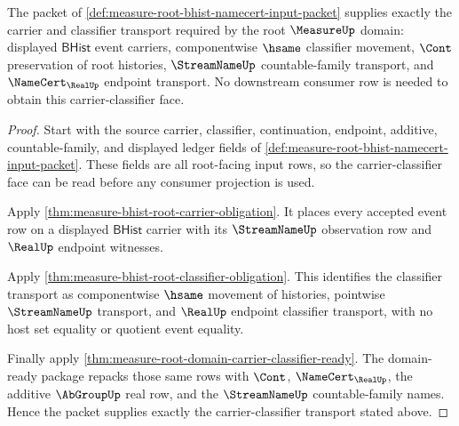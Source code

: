 \begin{theorem}
\label{thm:measure-root-bhist-input-carrier-classifier}
The packet of
\autoref{def:measure-root-bhist-namecert-input-packet} supplies exactly the
carrier and classifier transport required by the root $\MeasureUp$ domain:
displayed $\mathsf{BHist}$ event carriers, componentwise $\hsame$ classifier
movement, $\Cont$ preservation of root histories, $\StreamNameUp$
countable-family transport, and $\NameCert_{\RealUp}$ endpoint transport.
No downstream consumer row is needed to obtain this carrier-classifier face.
\end{theorem}
\begin{proof}
Start with the source carrier, classifier, continuation, endpoint, additive,
countable-family, and displayed ledger fields of
\autoref{def:measure-root-bhist-namecert-input-packet}. These fields are all
root-facing input rows, so the carrier-classifier face can be read before any
consumer projection is used.

Apply \autoref{thm:measure-bhist-root-carrier-obligation}. It places every
accepted event row on a displayed $\mathsf{BHist}$ carrier with its
$\StreamNameUp$ observation row and $\RealUp$ endpoint witnesses.

Apply \autoref{thm:measure-bhist-root-classifier-obligation}. This identifies
the classifier transport as componentwise $\hsame$ movement of histories,
pointwise $\StreamNameUp$ transport, and $\RealUp$ endpoint classifier
transport, with no host set equality or quotient event equality.

Finally apply \autoref{thm:measure-root-domain-carrier-classifier-ready}. The
domain-ready package repacks those same rows with $\Cont$,
$\NameCert_{\RealUp}$, the additive $\AbGroupUp$ real row, and the
$\StreamNameUp$ countable-family names. Hence the packet supplies exactly the
carrier-classifier transport stated above.
\end{proof}

